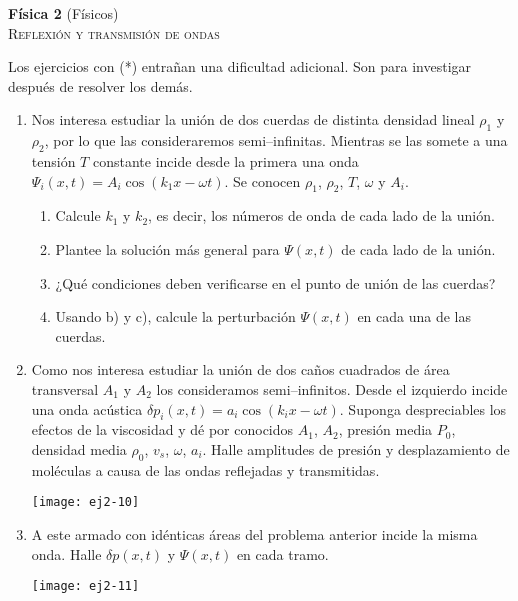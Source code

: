 \documentclass[11pt,spanish,a4paper]{article}
\begin{document}
\begin{center}
\textbf{Física 2} (Físicos) \hfill {}\\
	\textsc{\LARGE Reflexión y transmisión de ondas}
\end{center}

Los ejercicios con (*) entrañan una dificultad adicional. Son para investigar después de resolver los demás.



\begin{enumerate}

\item Nos interesa estudiar la unión de dos cuerdas de distinta densidad lineal $\rho_1$ y $\rho_2$, por lo que las consideraremos semi--infinitas. 
Mientras se las somete a una tensión $T$ constante incide desde la primera una onda $\Psi_i(x,t) = A_i \cos{ \left( k_{1} x- \omega t \right) }$.
Se conocen $\rho_{1}$, $\rho_{2}$, $T$, $\omega$ y $A_{i}$.
\begin{enumerate}
	\item Calcule $k_{1}$ y $k_{2}$, es decir, los números de onda de cada lado de la unión.
	\item Plantee la solución más general para $\Psi(x,t)$ de cada lado de la unión.
	\item ¿Qué condiciones deben verificarse en el punto de unión de las cuerdas?
	\item Usando b) y c), calcule la perturbación $\Psi(x,t)$ en cada una de las cuerdas.
\end{enumerate}


\item
\begin{minipage}[t][3.3cm]{0.6\textwidth}
Como nos interesa estudiar la unión de dos caños cuadrados de área transversal $A_1$ y $A_2$ los consideramos semi--infinitos.
Desde el izquierdo incide una onda acústica $\delta p_i (x,t) = a_i \cos{ \left( k_i x - \omega t \right) }$.
Suponga despreciables los efectos de la viscosidad y dé por conocidos $A_{1}$, $A_{2}$, presión media $P_{0}$, densidad media $\rho_{0}$, $v_{s}$, $\omega$, $a_i$.
Halle amplitudes de presión y desplazamiento de moléculas a causa de las ondas reflejadas y transmitidas.
\end{minipage}
\begin{minipage}[c][0cm][t]{0.34\textwidth}
	\texttt{[image: ej2-10]}
\end{minipage}


\item 
\begin{minipage}[t][1.6cm]{0.6\textwidth}
A este armado con idénticas áreas del problema anterior incide la misma onda.
Halle $\delta p(x,t)$ y $\Psi(x,t)$ en cada tramo.
\end{minipage}
\begin{minipage}[c][1cm][t]{0.34\textwidth}
	\texttt{[image: ej2-11]}
\end{minipage}



\end{enumerate}
\end{document}
